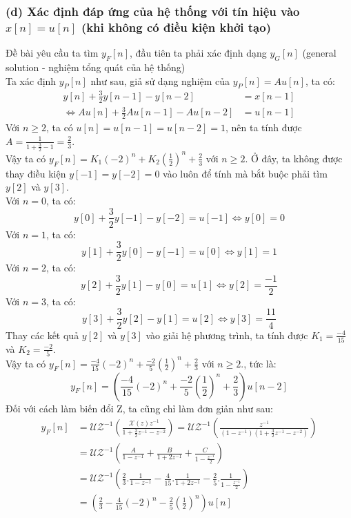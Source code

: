 \documentclass{article}
\begin{document}
\subsubsection*{(d) Xác định đáp ứng của hệ thống với tín hiệu vào $x[n]=u[n]$ (khi không có điều kiện khởi tạo)}
Đề bài yêu cầu ta tìm $y_{F}[n]$, đầu tiên ta phải xác định dạng $y_{G}[n]$ (general solution - nghiệm tổng quát của hệ thống)
\\Ta xác định $y_{P}[n]$ như sau, giả sử dạng nghiệm của $y_{P}[n] = Au[n]$, ta có:
\begin{equation*}
\begin{split}
y[n]+\frac{3}{2}y[n-1]-y[n-2]&=x[n-1]\\\Leftrightarrow Au[n]+\frac{3}{2}Au[n-1]-Au[n-2]&=u[n-1]
\end{split}
\end{equation*}
Với $n\geq2$, ta có $u[n]=u[n-1]=u[n-2]=1$, nên ta tính được $A=\frac{1}{1+\frac{3}{2}-1}=\frac{2}{3}$.
\\Vậy ta có $y_{F}[n]=K_{1}(-2)^{n}+K_{2}(\frac{1}{2})^{n}+\frac{2}{3}$ với $n\geq2$. Ở đây, ta không được thay điều kiện $y[-1]=y[-2]=0$ vào luôn để tính mà bắt buộc phải tìm $y[2]$ và $y[3]$.\\
Với $n=0$, ta có:
$$y[0]+\frac{3}{2}y[-1]-y[-2]=u[-1]\Leftrightarrow y[0]=0$$
Với $n=1$, ta có:
$$y[1]+\frac{3}{2}y[0]-y[-1]=u[0]\Leftrightarrow y[1]=1$$
Với $n=2$, ta có:
$$y[2]+\frac{3}{2}y[1]-y[0]=u[1]\Leftrightarrow y[2]=\frac{-1}{2}$$
Với $n=3$, ta có:
$$y[3]+\frac{3}{2}y[2]-y[1]=u[2]\Leftrightarrow y[3]=\frac{11}{4}$$
Thay các kết quả $y[2]$ và $y[3]$ vào giải hệ phương trình, ta tính được $K_{1}=\frac{-4}{15}$ và $K_{2}=\frac{-2}{5}$.
\\Vậy ta có $y_{F}[n]=\frac{-4}{15}(-2)^{n}+\frac{-2}{5}(\frac{1}{2})^{n}+\frac{2}{3}$ với $n\geq2$., tức là:
$$y_{F}[n]=\left(\frac{-4}{15}(-2)^{n}+\frac{-2}{5}\left(\frac{1}{2}\right)^{n}+\frac{2}{3}\right)u[n-2]$$
Đối với cách làm biến đổi Z, ta cũng chỉ làm đơn giản như sau:
\begin{equation*}
\begin{split}
y_{F}[n]&=\mathscr{UZ}^{-1}\left(\frac{\mathscr{X}(z)z^{-1}}{1+\frac{3}{2}z^{-1}-z^{-2}}\right)=\mathscr{UZ}^{-1}\left(\frac{z^{-1}}{(1-z^{-1})(1+\frac{3}{2}z^{-1}-z^{-2})}\right)\\&=\mathscr{UZ}^{-1}\left(\frac{A}{1-z^{-1}}+\frac{B}{1+2z^{-1}}+\frac{C}{1-\frac{z^{-1}}{2}}\right)\\&=\mathscr{UZ}^{-1}\left(\frac{2}{3}.\frac{1}{1-z^{-1}}-\frac{4}{15}.\frac{1}{1+2z^{-1}}-\frac{2}{5}.\frac{1}{1-\frac{z^{-1}}{2}}\right)\\&=\left(\frac{2}{3}-\frac{4}{15}(-2)^{n}-\frac{2}{5}\left(\frac{1}{2}\right)^{n}\right)u[n]
\end{split}
\end{equation*}
\end{document}
